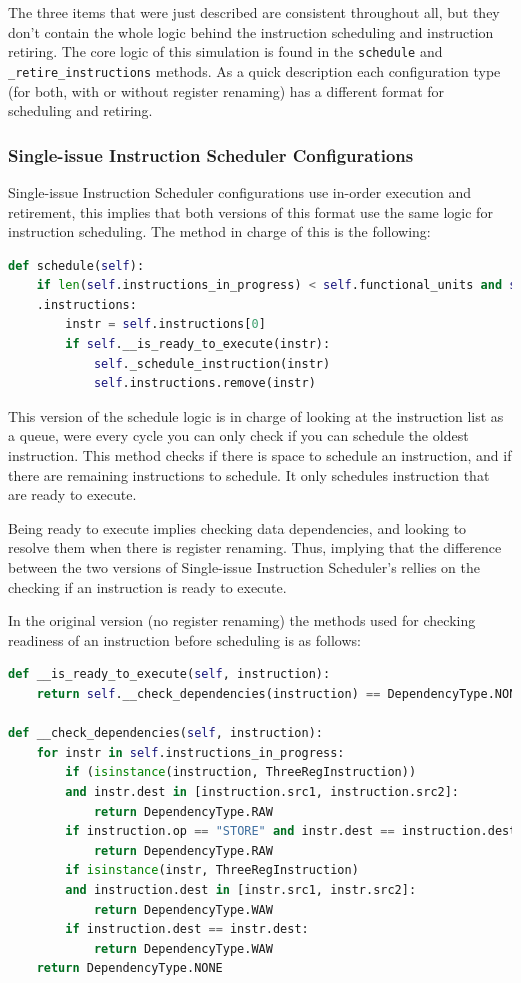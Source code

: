 \documentclass{article}
\begin{document}
The three items that were just described are consistent throughout all, but they don't contain the whole logic behind the instruction scheduling and instruction retiring. The core logic of this simulation is found in the \lstinline|schedule| and \lstinline|_retire_instructions| methods. As a quick description each configuration type (for both, with or without register renaming) has a different format for scheduling and retiring.

\subsubsection{Single-issue Instruction Scheduler Configurations}
Single-issue Instruction Scheduler configurations use in-order execution and retirement, this implies that both versions of this format use the same logic for instruction scheduling. The method in charge of this is the following:

\begin{lstlisting}[language=Python]
def schedule(self):
    if len(self.instructions_in_progress) < self.functional_units and self-
    .instructions:
        instr = self.instructions[0]
        if self.__is_ready_to_execute(instr):
            self._schedule_instruction(instr)
            self.instructions.remove(instr) 
\end{lstlisting}

This version of the schedule logic is in charge of looking at the instruction list as a queue, were every cycle you can only check if you can schedule the oldest instruction. This method checks if there is space to schedule an instruction, and if there are remaining instructions to schedule. It only schedules instruction that are ready to execute. 

Being ready to execute implies checking data dependencies, and looking to resolve them when there is register renaming. Thus, implying that the difference between the two versions of Single-issue Instruction Scheduler's rellies on the checking if an instruction is ready to execute.

In the original version (no register renaming) the methods used for checking readiness of an instruction before scheduling is as follows:

\begin{lstlisting}[language=Python]
def __is_ready_to_execute(self, instruction):
    return self.__check_dependencies(instruction) == DependencyType.NONE
    
def __check_dependencies(self, instruction):
    for instr in self.instructions_in_progress:
        if (isinstance(instruction, ThreeRegInstruction)) 
        and instr.dest in [instruction.src1, instruction.src2]:
            return DependencyType.RAW
        if instruction.op == "STORE" and instr.dest == instruction.dest:
            return DependencyType.RAW
        if isinstance(instr, ThreeRegInstruction) 
        and instruction.dest in [instr.src1, instr.src2]:
            return DependencyType.WAW
        if instruction.dest == instr.dest:
            return DependencyType.WAW
    return DependencyType.NONE
\end{lstlisting}
\end{document}
